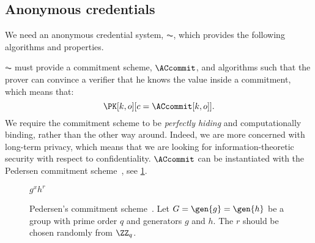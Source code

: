 \subsection{Anonymous credentials}%
\label{ZK-anon-cred}


We need an anonymous credential system, \(\AC\), which provides the following algorithms and properties.

\(\AC\) must provide a commitment scheme, \(\ACcommit\), and algorithms such that the prover can convince a verifier that he knows the value inside a commitment, which means that:
\begin{equation*}
  \PK[k, o][c = \ACcommit[k,o]].
\end{equation*}
We require the commitment scheme to be \emph{perfectly hiding} and computationally binding, rather than the other way around.
Indeed, we are more concerned with long-term privacy, which means that we are looking for information-theoretic security with respect to confidentiality.
\(\ACcommit\) can be instantiated with the Pedersen commitment 
scheme~\cite{PedersenCommitment}, see \cref{ACcommitAlg}.

\begin{figure}[p]
  \small
  \begin{algorithmic}
    \State \Return $g^x h^r$
    \EndFunction
  \end{algorithmic}
  \caption{\label{ACcommitAlg}%
    Pedersen's commitment scheme~\cite{PedersenCommitment}.
    Let \(G = \gen{g} = \gen{h}\) be a group with prime order \(q\) and 
    generators \(g\) and \(h\).%
    The \(r\) should be chosen randomly from \(\ZZ_q\).
  }
\end{figure}


